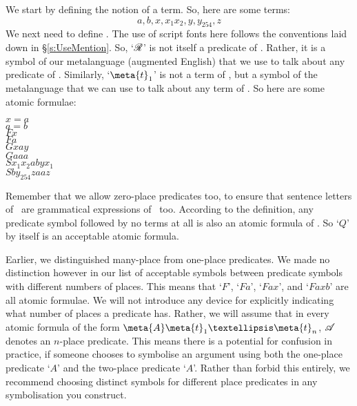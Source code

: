 We start by defining the notion of a term.
So, here are some terms:
	$$a, b, x, x_{1} x_{2}, y, y_{254}, z$$
We next need to define .
The use of script fonts here follows the conventions laid down in §\ref{s:UseMention}. So, `$\mathscr{R}$' is not itself a predicate of \FOL. Rather, it is a symbol of our metalanguage (augmented English) that we use to talk about any predicate of \FOL. Similarly, `$\meta{t}_{1}$' is not a term of \FOL, but a symbol of the metalanguage that we can use to talk about any term of \FOL. So here are some atomic formulae:
	\begin{center}
		$x = a$\\
		$a = b$\\
		$Fx$\\
		$Fa$\\
		$Gxay$\\
		$Gaaa$\\
		$Sx_{1} x_{2} a b y x_{1}$\\
		$Sby_{254} z a a z$\\
	\end{center}
Remember that we allow zero-place predicates too, to ensure that sentence letters of \TFL\ are grammatical expressions of \FOL\ too. According to the definition, any predicate symbol followed by no terms at all is also an atomic formula of \FOL. So `$Q$' by itself is an acceptable atomic formula.

Earlier, we distinguished many-place from one-place predicates. We made no distinction however in our list of acceptable symbols between predicate symbols with different numbers of places. This means that `$F$', `$Fa$', `$Fax$', and `$Faxb$' are all atomic formulae. We will not introduce any device for explicitly indicating what number of places a predicate has. Rather, we will assume that in every atomic formula of the form $\meta{A}\meta{t}_{1}…\meta{t}_{n}$, $\mathscr{A}$ denotes an $n$-place predicate. This means there is a potential for confusion in practice, if someone chooses to symbolise an argument using both the one-place predicate `$A$' and the two-place predicate `$A$'. Rather than forbid this entirely, we recommend choosing distinct symbols for different place predicates in any symbolisation you construct.

